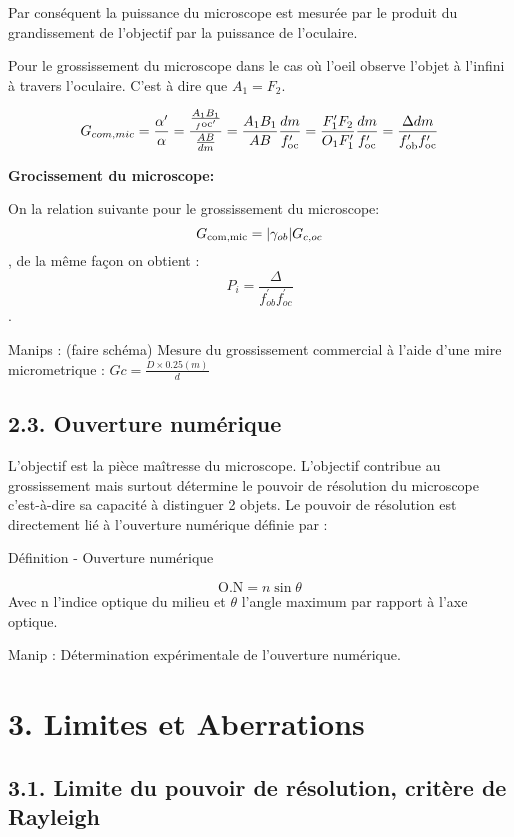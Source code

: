 \documentclass[french, a4paper, 10pt, twocolumn, landscape]{article}
\begin{document}
Par conséquent la puissance du microscope est mesurée par le produit du grandissement de l'objectif par la puissance de l'oculaire.

Pour le grossissement du microscope dans le cas où l'oeil observe l'objet à l'infini à travers l'oculaire. C'est à dire que $A_1=F_2$. 

$$G_{com,mic} = \frac{\alpha^\prime}{\alpha} = \frac{\frac{A_1B_1}{_f{\rm oc}^\prime}}{\frac{AB}{dm}} = \frac{A_1B_1}{AB}\frac{dm}{f_{\rm oc }^\prime} = \frac{F_1^\prime F_2}{O_1F_1^\prime}\frac{dm}{f_{\rm oc }^\prime} = \frac{\Delta dm}{f_{\rm ob}^\prime f_{\rm oc}^\prime}$$




		\textbf{Grocissement du microscope:}\medskip 

		On la relation suivante pour le grossissement du microscope: 
		$$G_{\rm com,mic} = |\gamma_{ob}|G_{c, oc}$$, de la même façon on obtient : $$P_i = \frac{\Delta}{f_{ob}^\prime f_{oc}^\prime }$$.


Manips : (faire schéma) Mesure du grossissement commercial à l'aide d'une mire micrometrique : $Gc = \frac{D\times 0.25 (m)}{d}$

\subsection*{2.3. Ouverture numérique}

L'objectif est la pièce maîtresse du microscope. L'objectif contribue au grossissement mais surtout détermine le pouvoir de résolution du microscope c’est-à-dire sa capacité à distinguer 2 objets. Le pouvoir de résolution est directement lié à l’ouverture numérique définie par :

	\begin{definition}{Définition - Ouverture numérique}

		$$\text{O.N} = n \sin\theta$$
		Avec n l’indice optique du milieu et $\theta$ l’angle maximum par rapport à l’axe optique.

	\end{definition}


Manip : Détermination expérimentale de l’ouverture numérique.


\section*{3. Limites et Aberrations}
\subsection*{3.1. Limite du pouvoir de résolution, critère de Rayleigh}
\end{document}
